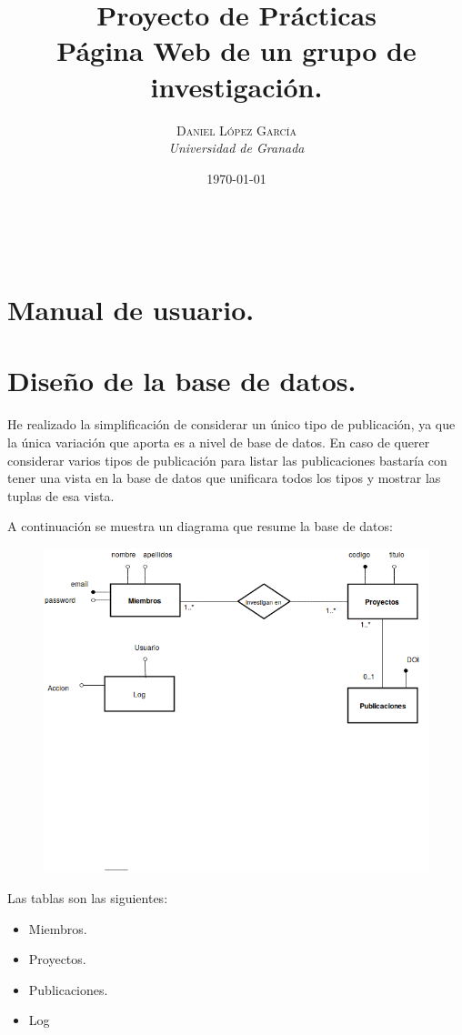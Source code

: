\documentclass[a4paper, 11pt]{article} %
\title{\textbf{Proyecto de Prácticas}\\ %
\vspace{20 pt}Página Web de un grupo de investigación.
} %
\author{\textsc{Daniel López García} %
\\{\textit{Universidad de Granada}}} %
\date{\today} %
\makeatletter
\renewcommand{\maketitle}{ %
	\begin{center} %
		{\Huge\@title} %
	\end{center}
	
	\vspace{20pt} %
	
	\begin{flushright} %
		{\large\@author} %
		\\\@date %
		
		\vspace{40pt} %
	\end{flushright}
	\renewcommand{\baselinestretch}{0.5}
	
}
\makeatother
\begin{document}
	\maketitle
\section{Manual de usuario.}
\section{Diseño de la base de datos.}
He realizado la simplificación de considerar un único tipo de publicación, ya que la única variación que aporta es a nivel de base de datos. En caso de querer considerar varios tipos de publicación para listar las publicaciones bastaría con tener una vista en la base de datos que unificara todos los tipos y mostrar las tuplas de esa vista. 
\medskip

A continuación se muestra un diagrama que resume la base de datos:
\begin{figure}[H]
	\includegraphics[scale=0.65]{./diagrama_er.png}
\end{figure}

	
\medskip
Las tablas son las siguientes:
\begin{itemize}
	\item Miembros.
	\item Proyectos.
	\item Publicaciones.
	\item Log
\end{itemize}
\end{document}
